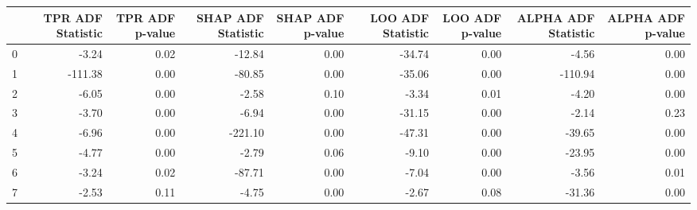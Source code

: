 \begin{tabular}{lrrrrrrrr}
\toprule
 & TPR ADF Statistic & TPR ADF p-value & SHAP ADF Statistic & SHAP ADF p-value & LOO ADF Statistic & LOO ADF p-value & ALPHA ADF Statistic & ALPHA ADF p-value \\
\midrule
0 & -3.24 & 0.02 & -12.84 & 0.00 & -34.74 & 0.00 & -4.56 & 0.00 \\
1 & -111.38 & 0.00 & -80.85 & 0.00 & -35.06 & 0.00 & -110.94 & 0.00 \\
2 & -6.05 & 0.00 & -2.58 & 0.10 & -3.34 & 0.01 & -4.20 & 0.00 \\
3 & -3.70 & 0.00 & -6.94 & 0.00 & -31.15 & 0.00 & -2.14 & 0.23 \\
4 & -6.96 & 0.00 & -221.10 & 0.00 & -47.31 & 0.00 & -39.65 & 0.00 \\
5 & -4.77 & 0.00 & -2.79 & 0.06 & -9.10 & 0.00 & -23.95 & 0.00 \\
6 & -3.24 & 0.02 & -87.71 & 0.00 & -7.04 & 0.00 & -3.56 & 0.01 \\
7 & -2.53 & 0.11 & -4.75 & 0.00 & -2.67 & 0.08 & -31.36 & 0.00 \\
\bottomrule
\end{tabular}
